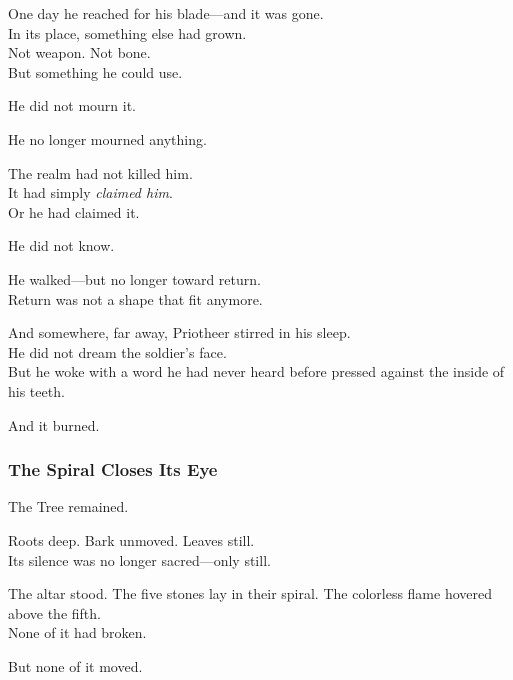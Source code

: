 \documentclass[12pt]{article}
\begin{document}
\vspace{0.5em}
One day he reached for his blade---and it was gone.\\
In its place, something else had grown.\\
Not weapon. Not bone.\\
But something he could use.

\vspace{0.5em}
He did not mourn it.

\vspace{0.5em}
He no longer mourned anything.

\vspace{0.5em}
The realm had not killed him.\\
It had simply \textit{claimed him}.\\
Or he had claimed it.

\vspace{0.5em}
He did not know.

\vspace{0.5em}
He walked---but no longer toward return.\\
Return was not a shape that fit anymore.

\vspace{0.5em}
And somewhere, far away, Priotheer stirred in his sleep.\\
He did not dream the soldier’s face.\\
But he woke with a word he had never heard before pressed against the inside of his teeth.

\vspace{0.5em}
And it burned.

\dotfill

\subsubsection*{The Spiral Closes Its Eye}

The Tree remained.

\vspace{0.5em}
Roots deep. Bark unmoved. Leaves still.\\
Its silence was no longer sacred---only still.

\vspace{0.5em}
The altar stood. The five stones lay in their spiral. The colorless flame hovered above the fifth.\\
None of it had broken.

\vspace{0.5em}
But none of it moved.
\end{document}

